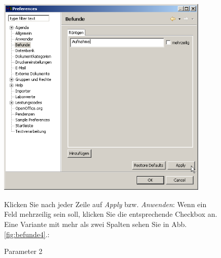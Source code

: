\begin{figure}[htbp]
   \begin{minipage}{0.35\textwidth}
       \centering
       \includegraphics[width=0.9\textwidth]{images/befunde2}
       \caption{Parameter 2}
       \label{fig:befundesettings}
     \end{minipage}\hfill
     \begin{minipage}{0.65\textwidth}
        Klicken Sie nach jeder Zeile auf  \textit{Apply}  bzw.  \textit{Anwenden}:
        Wenn ein Feld mehrzeilig sein soll, klicken Sie die entsprechende Checkbox an. Eine Variante mit mehr als zwei Spalten sehen Sie in Abb. \ref{fig:befunde4}.:

    \end{minipage}
\end{figure}

